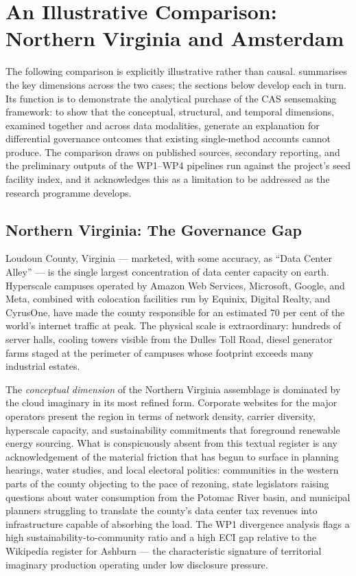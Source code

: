 \section{An Illustrative Comparison: Northern Virginia and Amsterdam}
\label{sec:case}

The following comparison is explicitly illustrative rather than causal.  summarises the key dimensions across the two cases; the sections below develop each in turn. Its function is to demonstrate the analytical purchase of the CAS sensemaking framework: to show that the conceptual, structural, and temporal dimensions, examined together and across data modalities, generate an explanation for differential governance outcomes that existing single-method accounts cannot produce. The comparison draws on published sources, secondary reporting, and the preliminary outputs of the WP1--WP4 pipelines run against the project's seed facility index, and it acknowledges this as a limitation to be addressed as the research programme develops.

\subsection{Northern Virginia: The Governance Gap}

Loudoun County, Virginia — marketed, with some accuracy, as ``Data Center Alley'' — is the single largest concentration of data center capacity on earth. Hyperscale campuses operated by Amazon Web Services, Microsoft, Google, and Meta, combined with colocation facilities run by Equinix, Digital Realty, and CyrusOne, have made the county responsible for an estimated 70 per cent of the world's internet traffic at peak. The physical scale is extraordinary: hundreds of server halls, cooling towers visible from the Dulles Toll Road, diesel generator farms staged at the perimeter of campuses whose footprint exceeds many industrial estates.

The \textit{conceptual dimension} of the Northern Virginia assemblage is dominated by the cloud imaginary in its most refined form. Corporate websites for the major operators present the region in terms of network density, carrier diversity, hyperscale capacity, and sustainability commitments that foreground renewable energy sourcing. What is conspicuously absent from this textual register is any acknowledgement of the material friction that has begun to surface in planning hearings, water studies, and local electoral politics: communities in the western parts of the county objecting to the pace of rezoning, state legislators raising questions about water consumption from the Potomac River basin, and municipal planners struggling to translate the county's data center tax revenues into infrastructure capable of absorbing the load. The WP1 divergence analysis flags a high sustainability-to-community ratio and a high ECI gap relative to the Wikipedia register for Ashburn — the characteristic signature of territorial imaginary production operating under low disclosure pressure.

